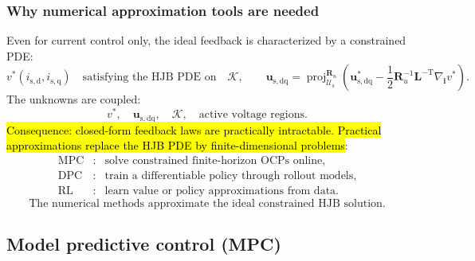 \begin{frame}
	\frametitle{Why numerical approximation tools are needed}
	Even for current control only, the ideal feedback is characterized by a constrained PDE:
	\begin{equation*}
		v^*(i_{\mathrm{s,d}},i_{\mathrm{s,q}})\quad\text{satisfying the HJB PDE on}\quad\mathcal{K},
		\qquad
		\bm{u}_{\mathrm{s,dq}}
		=\operatorname{proj}_{\mathcal{U}_\mathrm{s}}^{\bm{R}_u}
		\left(\bm{u}_{\mathrm{s,dq}}^*-\frac{1}{2}\bm{R}_u^{-1}\bm{L}^{-\mathrm{T}}
		\nabla_{\bm{i}}v^*\right).
	\end{equation*}\pause%
	The unknowns are coupled:
	\begin{equation*}
		\boxed{v^*,\quad \bm{u}_{\mathrm{s,dq}},\quad
			\mathcal{K},\quad \text{active voltage regions}.}
	\end{equation*}\pause%
	\hl{Consequence: closed-form feedback laws are practically intractable.   Practical approximations replace the HJB PDE by finite-dimensional problems}:
	\begin{equation*}
		\begin{array}{rcl}
			\text{MPC} & : & \text{solve constrained finite-horizon OCPs online},         \\[1mm]
			\text{DPC} & : & \text{train a differentiable policy through rollout models}, \\[1mm]
			\text{RL}  & : & \text{learn value or policy approximations from data}.
		\end{array}
	\end{equation*}\pause%
	\begin{equation*}
		\boxed{\text{The numerical methods approximate the ideal constrained HJB solution.}}
	\end{equation*}
\end{frame}

\subsection{Model predictive control (MPC)}

